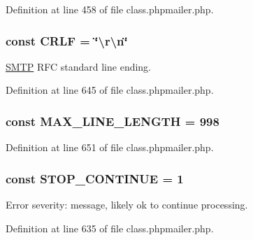 Definition at line 458 of file class.\+phpmailer.\+php.

\subsubsection[{\texorpdfstring{C\+R\+LF}{CRLF}}]{\setlength{\rightskip}{0pt plus 5cm}const C\+R\+LF = \char`\"{}\textbackslash{}r\textbackslash{}n\char`\"{}}\hypertarget{class_p_h_p_mailer_aa8bdd4d85e1ba0db8c09f92688c27ca6}{}\label{class_p_h_p_mailer_aa8bdd4d85e1ba0db8c09f92688c27ca6}
\hyperlink{class_s_m_t_p}{S\+M\+TP} R\+FC standard line ending. 

Definition at line 645 of file class.\+phpmailer.\+php.

\subsubsection[{\texorpdfstring{M\+A\+X\+\_\+\+L\+I\+N\+E\+\_\+\+L\+E\+N\+G\+TH}{MAX_LINE_LENGTH}}]{\setlength{\rightskip}{0pt plus 5cm}const M\+A\+X\+\_\+\+L\+I\+N\+E\+\_\+\+L\+E\+N\+G\+TH = 998}\hypertarget{class_p_h_p_mailer_a466169b7248c947b2d0d468a955573e7}{}\label{class_p_h_p_mailer_a466169b7248c947b2d0d468a955573e7}


Definition at line 651 of file class.\+phpmailer.\+php.

\subsubsection[{\texorpdfstring{S\+T\+O\+P\+\_\+\+C\+O\+N\+T\+I\+N\+UE}{STOP_CONTINUE}}]{\setlength{\rightskip}{0pt plus 5cm}const S\+T\+O\+P\+\_\+\+C\+O\+N\+T\+I\+N\+UE = 1}\hypertarget{class_p_h_p_mailer_afd1dcd18845b2e660d89726b20cd566e}{}\label{class_p_h_p_mailer_afd1dcd18845b2e660d89726b20cd566e}
Error severity\+: message, likely ok to continue processing. 

Definition at line 635 of file class.\+phpmailer.\+php.

